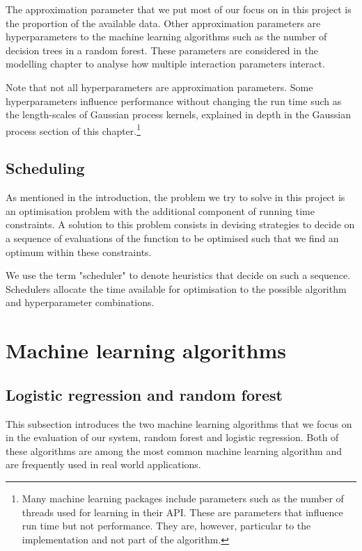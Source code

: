 \documentclass[a4paper,12pt,twoside,openright]{report}
\begin{document}
The approximation parameter that we put most of our focus on in this project is the proportion of the available data. Other approximation parameters are hyperparameters to the machine learning algorithms such as the number of decision trees in a random forest. These parameters are considered in the modelling chapter to analyse how multiple interaction parameters interact.

Note that not all hyperparameters are approximation parameters. Some hyperparameters influence performance without changing the run time such as the length-scales of Gaussian process kernels, explained in depth in the Gaussian process section of this chapter.\footnote{Many machine learning packages include parameters such as the number of threads used for learning in their API. These are parameters that influence run time but not performance. They are, however, particular to the implementation and not part of the algorithm.}



\subsection{Scheduling}
As mentioned in the introduction, the problem we try to solve in this project is an optimisation problem with the additional component of running time constraints. A solution to this problem consists in devising strategies to decide on a sequence of evaluations of the function to be optimised such that we find an optimum within these constraints. 

We use the term "scheduler" to denote heuristics that decide on such a sequence. Schedulers allocate the time available for optimisation to the possible algorithm and hyperparameter combinations.

\section{Machine learning algorithms}
\subsection{Logistic regression and random forest}
This subsection introduces the two machine learning algorithms that we focus on in the evaluation of our system, random forest and logistic regression. Both of these algorithms are among the most common machine learning algorithm and are frequently used in real world applications. %
\end{document}
